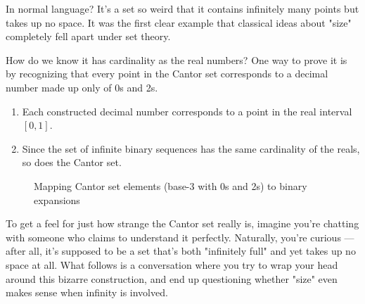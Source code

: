 In normal language? It’s a set so weird that it contains infinitely many points but takes up no space. It was the first clear example that classical ideas about "size" completely fell apart under set theory.

How do we know it has cardinality as the real numbers? One way to prove it is by recognizing that every point in the Cantor set corresponds to a decimal number made up only of 0s and 2s.

\begin{enumerate}
	\item Each constructed decimal number corresponds to a point in the real interval $[0,1]$.
	\item Since the set of infinite binary sequences has the same cardinality of the reals, so does the Cantor set.
\end{enumerate}

\begin{figure}[H]
\centering
{}
\caption{Mapping Cantor set elements (base-3 with 0s and 2s) to binary expansions}
\end{figure}



To get a feel for just how strange the Cantor set really is, imagine you’re chatting with someone who claims to understand it perfectly. Naturally, you're curious — after all, it's supposed to be a set that's both "infinitely full" and yet takes up no space at all. What follows is a conversation where you try to wrap your head around this bizarre construction, and end up questioning whether "size" even makes sense when infinity is involved.


